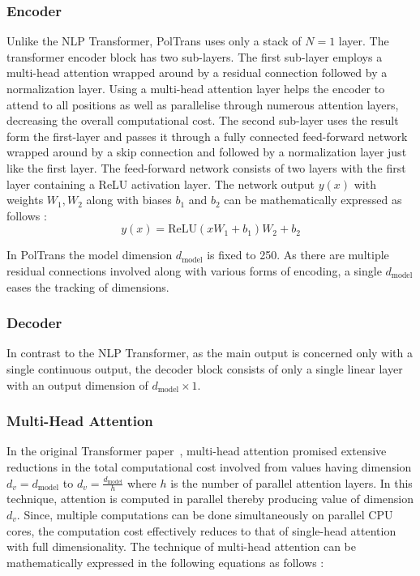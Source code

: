 \documentclass[10pt,journal]{IEEEtran}
\begin{document}
\subsubsection{Encoder} 
Unlike the NLP Transformer, {PolTrans}  uses only a stack of ${N = 1}$ layer. The transformer encoder block has two sub-layers.  The first sub-layer employs a multi-head attention wrapped around by a residual connection followed by a normalization layer. Using a multi-head attention layer helps the encoder to attend to all positions as well as parallelise through numerous attention layers, decreasing the overall computational cost. The second sub-layer uses the result form the first-layer and passes it through a fully connected feed-forward network wrapped around by a skip connection and followed by a normalization layer just like the first layer. 
The feed-forward network consists of two layers with the first layer containing a ReLU activation layer. The network output ${y(x)}$ with weights ${W_1,  W_2}$ along with biases ${b_1}$ and ${b_2}$ can be mathematically expressed as follows :
\begin{equation}
y (x) = \text{ReLU}(xW_1 + b_1)W_2 + b_2
\end{equation}

In {PolTrans}  the model dimension ${d_{\text{model}}}$ is fixed to 250. As there are multiple residual connections involved along with various forms of encoding, a single ${d_{\text{model}}}$ eases the tracking of dimensions.

\subsubsection{Decoder}
In contrast to the NLP Transformer, as the main output is concerned only with a single continuous output, the decoder block consists of only a single linear layer with an output dimension of ${d_{\text{model}} \times 1}$.

\subsubsection{Multi-Head Attention}
In the original Transformer paper~\cite{Vaswani.2017}, multi-head attention promised extensive reductions in the total computational cost involved from values having dimension ${d_{v} = d_{\text{model}}}$ to ${d_{v} =  \frac{d_{\text{model}}}{h}}$ where ${h}$ is the number of parallel attention layers. In this technique, attention is computed in parallel thereby producing value of dimension ${d_{v}}$. Since, multiple computations can be done simultaneously on parallel CPU cores, the computation cost effectively reduces to that of single-head attention with full dimensionality. The technique of multi-head attention can be mathematically expressed in the following equations as follows : 
\end{document}

